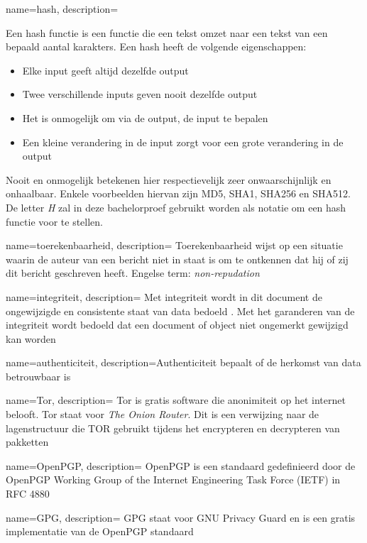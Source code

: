 {
	name={hash},
	description={
		Een hash functie is een functie die een tekst omzet naar een
		tekst van een bepaald aantal karakters. Een hash heeft de volgende
		eigenschappen:
		\begin{itemize}
			\item Elke input geeft altijd dezelfde output
			\item Twee verschillende inputs geven nooit dezelfde output
			\item Het is onmogelijk om via de output, de input te bepalen
			\item Een kleine verandering in de input zorgt voor een grote
			verandering in de output
		\end{itemize}
		Nooit en onmogelijk betekenen hier respectievelijk zeer
		onwaarschijnlijk en onhaalbaar.
		Enkele voorbeelden hiervan zijn MD5, SHA1, SHA256 en SHA512. \\
		De letter \textit{H} zal in deze bachelorproef gebruikt worden als
		notatie om een hash functie voor te stellen.}
}

{
	name={toerekenbaarheid},
	description={
		Toerekenbaarheid wijst op een situatie waarin de auteur van een bericht
		niet in staat is om te ontkennen dat hij of zij dit bericht
		geschreven heeft. Engelse term: \textit{non-repudation}}
}

{
	name={integriteit},
	description={
		Met integriteit wordt in dit document de ongewijzigde en
		consistente staat van data bedoeld \autocite{Boritz2005}. Met het
		garanderen van de integriteit wordt bedoeld dat een document
		of object niet ongemerkt gewijzigd kan worden}
}

{
	name={authenticiteit},
	description={Authenticiteit bepaalt of de herkomst van data betrouwbaar is}
}

{
	name={Tor},
	description={
		Tor is gratis software die anonimiteit op het internet belooft. Tor
		staat voor \textit{The Onion Router}. Dit is een verwijzing naar de
		lagenstructuur die TOR gebruikt tijdens het encrypteren en decrypteren
		van pakketten \autocite{Tor}}
}

{
	name={OpenPGP},
	description={
		OpenPGP is een standaard gedefinieerd door de OpenPGP Working Group of
		the Internet Engineering Task Force (IETF) in RFC 4880
		\autocite{rfc4880}}
}

{
	name={GPG},
	description={
		GPG staat voor GNU Privacy Guard en is een gratis implementatie van de
		OpenPGP standaard \autocite{Gnu}}
}

